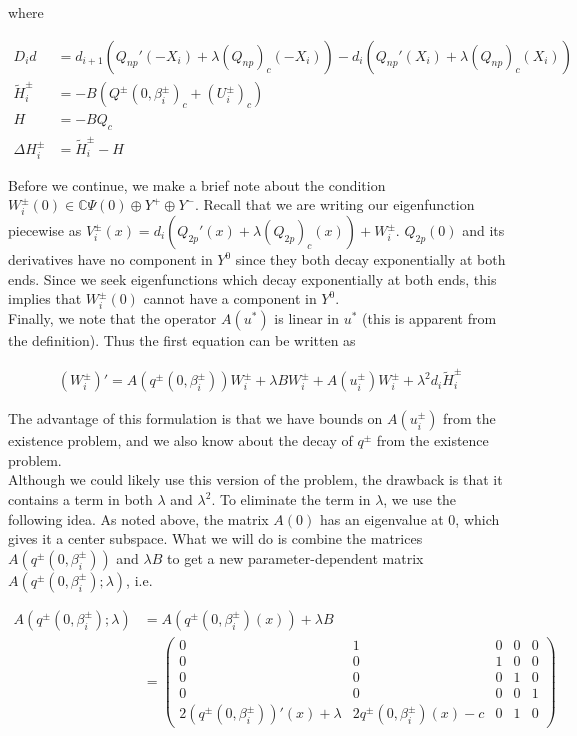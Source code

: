 \documentclass[12pt]{article}
\def\C{{\mathbb C}}
\begin{document}
where

\begin{align*}
D_i d &= d_{i+1}(Q_{np}'(-X_i) + \lambda (Q_{np})_c(-X_i))
- d_i ( Q_{np}'(X_i) + \lambda (Q_{np})_c(X_i) ) \\
\tilde{H}_i^\pm &= -B( Q^\pm(0, \beta_i^\pm)_c + (U_i^\pm)_c)  \\
H &= -B Q_c \\
\Delta H_i^\pm &= \tilde{H}_i^\pm - H
\end{align*}

Before we continue, we make a brief note about the condition $W_i^\pm(0) \in \C \Psi(0) \oplus Y^+ \oplus Y^-$. Recall that we are writing our eigenfunction piecewise as $V_i^\pm(x) = d_i(Q_{2p}'(x) + \lambda (Q_{2p})_c(x)) + W_i^\pm $. $Q_{2p}(0)$ and its derivatives have no component in $Y^0$ since they both decay exponentially at both ends. Since we seek eigenfunctions which decay exponentially at both ends, this implies that $W_i^\pm(0)$ cannot have a component in $Y^0$.\\

Finally, we note that the operator $A(u^*)$ is linear in $u^*$ (this is apparent from the definition). Thus the first equation can be written as 

\begin{align*}
(W_i^\pm)' = A(q^\pm(0, \beta_i^\pm)) W_i^\pm + \lambda B W_i^\pm + A(u_i^\pm) W_i^\pm + \lambda^2 d_i \tilde{H}_i^\pm
\end{align*}

The advantage of this formulation is that we have bounds on $A(u_i^\pm)$ from the existence problem, and we also know about the decay of $q^\pm$ from the existence problem.\\

Although we could likely use this version of the problem, the drawback is that it contains a term in both $\lambda$ and $\lambda^2$. To eliminate the term in $\lambda$, we use the following idea. As noted above, the matrix $A(0)$ has an eigenvalue at 0, which gives it a center subspace. What we will do is combine the matrices $A(q^\pm(0, \beta_i^\pm))$ and $\lambda B$ to get a new parameter-dependent matrix $A(q^\pm(0, \beta_i^\pm); \lambda)$, i.e. 

\begin{align*}
A(q^\pm(0, \beta_i^\pm); \lambda) &= A(q^\pm(0, \beta_i^\pm)(x)) + \lambda B \\
&= \begin{pmatrix}0 & 1 & 0 & 0 & 0 \\0 & 0 & 1 & 0 & 0 \\0 & 0 & 0 & 1 & 0 \\0 & 0 & 0 & 0 & 1 \\
2 (q^\pm(0, \beta_i^\pm))'(x) + \lambda & 2 q^\pm(0, \beta_i^\pm)(x) - c & 0 & 1 & 0 \end{pmatrix}
\end{align*}
\end{document}
